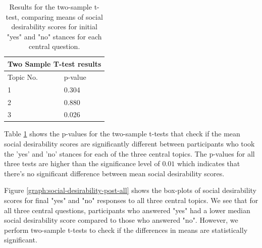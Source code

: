 \documentclass[journal]{IEEEtran}
\begin{document}
\begin{table}[ht]
    \centering
    \begin{tabular}{ll}
\hline
\multicolumn{2}{c}{\textbf{Two Sample T-test results}} \\
\hline
Topic No.    & p-value \\
\hline
1   &   0.304   \\
2   &   0.880   \\
3   &   0.026   \\
\hline
\end{tabular}
    \caption{Results for the two-sample t-test, comparing means of social desirability scores for initial "yes" and "no" stances for each central question.}
    \label{tab:twosample-ttest-results}
\end{table}

Table \ref{tab:twosample-ttest-results} shows the p-values for the two-sample t-tests that check if the mean social desirability scores are significantly different between participants who took the 'yes' and 'no' stances for each of the three central topics. The p-values for all three tests are higher than the significance level of $0.01$ which indicates that there's no significant difference between mean social desirability scores.

Figure \ref{graph:social-desirability-post-all} shows the box-plots of social desirability scores for final "yes" and "no" responses to all three central topics. We see that for all three central questions, participants who answered "yes" had a lower median social desirability score compared to those who answered "no". However, we perform two-sample t-tests to check if the differences in means are statistically significant.
\end{document}
